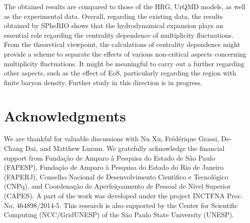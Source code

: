 \documentclass[secnumarabic, graphics,floatfix, nofootinbib,tightenlines,nobibnotes, aps, prl, 12pt]{revtex4-1}
\begin{document}
The obtained results are compared to those of the HRG, UrQMD models, as well as the experimental data.
Overall, regarding the existing data, the results obtained by SPheRIO shows that the hydrodynamical expansion plays an essential role regarding the centrality dependence of multiplicity fluctuations.
From the theoretical viewpoint, the calculations of centrality dependence might provide a scheme to separate the effects of various non-critical aspects concerning multiplicity fluctuations.
It might be meaningful to carry out a further regarding other aspects, such as the effect of EoS, particularly regarding the region with finite baryon density. 
Further study in this direction is in progress.   

\section*{Acknowledgments}
We are thankful for valuable discussions with Nu Xu, Fr\'ed\'erique Grassi, De-Chang Dai, and Matthew Luzum. 
We gratefully acknowledge the financial support from
Funda\c{c}\~ao de Amparo \`a Pesquisa do Estado de S\~ao Paulo (FAPESP),
Funda\c{c}\~ao de Amparo \`a Pesquisa do Estado do Rio de Janeiro (FAPERJ),
Conselho Nacional de Desenvolvimento Cient\'{\i}fico e Tecnol\'ogico (CNPq),
and Coordena\c{c}\~ao de Aperfei\c{c}oamento de Pessoal de N\'ivel Superior (CAPES).
A part of the work was developed under the project INCTFNA Proc. No. 464898/2014-5.
This research is also supported by the Center for Scientific Computing (NCC/GridUNESP) of the S\~ao Paulo State University (UNESP).
\end{document}
